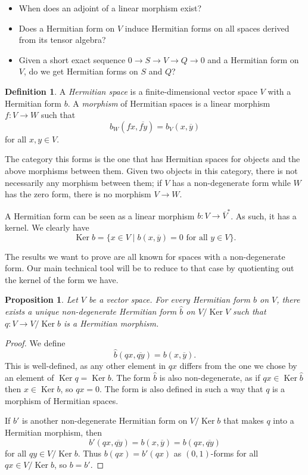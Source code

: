 \documentclass[10pt,a4paper]{amsart}
\newtheorem{prop}[theo]{Proposition}
\theoremstyle{definition}
\newtheorem{defi}[theo]{Definition}
\def\ov#1{\overline{#1}}
\DeclareMathOperator{\Ker}{Ker}
\begin{document}
\begin{itemize}
\item
When does an adjoint of a linear morphism exist?

\item
Does a Hermitian form on $V$ induce Hermitian forms on all spaces derived from its tensor algebra?

\item
Given a short exact sequence $0 \to S \to V \to Q \to 0$ and a Hermitian form on $V$, do we get Hermitian forms on $S$ and $Q$?
\end{itemize}


\begin{defi}
A \emph{Hermitian space} is a finite-dimensional vector space $V$ with a Hermitian form $b$.
A \emph{morphism} of Hermitian spaces is a linear morphism $f : V \to W$ such that
\[
b_W(fx, \ov{fy}) = b_V(x, \ov y)
\]
for all $x, y \in V$.
\end{defi}

The category this forms is the one that has Hermitian spaces for objects and the above morphisms between them. Given two objects in this category, there is not necessarily any morphism between them; if $V$ has a non-degenerate form while $W$ has the zero form, there is no morphism $V \to W$.

A Hermitian form can be seen as a linear morphism $b : V \to \ov V^*$. As such, it has a kernel. We clearly have
\[
\Ker b = \{ x \in V \mid b(x, \ov y) = 0 \text{ for all $y \in V$}\}.
\]


The results we want to prove are all known for spaces with a non-degenerate form. Our main technical tool will be to reduce to that case by quotienting out the kernel of the form we have.

\begin{prop}
Let $V$ be a vector space. For every Hermitian form $b$ on $V$, there exists a unique non-degenerate Hermitian form $\hat b$ on $V / \Ker V$ such that $q : V \to V/\Ker b$ is a Hermitian morphism.
\end{prop}


\begin{proof}
We define
\[
\hat b(qx, \ov{qy})
= b(x, \ov y).
\]
This is well-defined, as any other element in $qx$ differs from the one we chose by an element of $\Ker q = \Ker b$. The form $\hat b$ is also non-degenerate, as if $qx \in \Ker \hat b$ then $x \in \Ker b$, so $qx = 0$. The form is also defined in such a way that $q$ is a morphism of Hermitian spaces.

If $b'$ is another non-degenerate Hermitian form on $V / \Ker b$ that makes $q$ into a Hermitian morphism, then
\[
b'(qx, \ov{qy})
= b(x, \ov{y})
= b(qx, \ov{qy})
\]
for all $qy \in V / \Ker b$. Thus $b(qx) = b'(qx)$ as $(0,1)$-forms for all $qx \in V / \Ker b$, so $b = b'$.
\end{proof}
\end{document}
